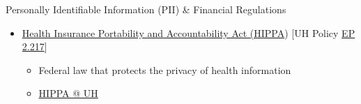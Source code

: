 \begin{frame}
\begin{block}{Personally Identifiable Information (PII)  \& Financial Regulations}
\begin{itemize}
    \item \href{https://www.hhs.gov/hipaa/for-professionals/security/laws-regulations/index.html}{Health Insurance Portability and Accountability Act (HIPPA}) [UH Policy \href{https://www.hawaii.edu/policy/index.php?action=viewPolicy\&policySection=ep\&policyChapter=2\&policyNumber=217\&menuView=closed}{EP 2.217}]
      \begin{itemize}
      \item Federal law that protects the privacy of health information
        \item \href{https://www.hawaii.edu/infosec/hipaa/}{HIPPA @ UH}
      \end{itemize}
    \end{itemize}  
  \end{block}
\end{frame}  



